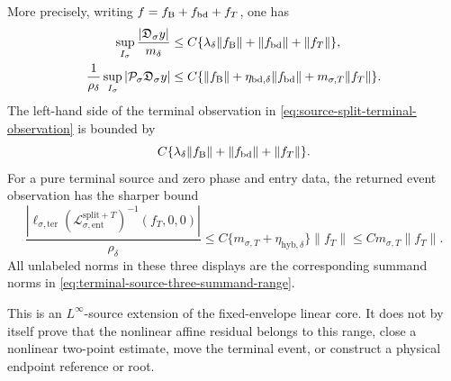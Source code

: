 \begin{corollary}
More precisely, writing
\(
f=f_{\rm B}+f_{\rm bd}+f_T
\), one has
\begin{align}
 \sup_{I_\sigma}\frac{|\mathfrak D_\sigma y|}{m_\delta}
 &\le C\{\lambda_\delta\|f_{\rm B}\|
       +\|f_{\rm bd}\|+\|f_T\|\},\notag\\
 \frac1{\rho_\delta}\sup_{I_\sigma}
       |\mathcal P_\sigma\mathfrak D_\sigma y|
 &\le C\{\|f_{\rm B}\|
       +\eta_{{\rm bd},\delta}\|f_{\rm bd}\|
       +m_{\sigma,T}\|f_T\|\}.                           \label{eq:terminal-source-returned-action-ledger}
\end{align}
The left-hand side of the terminal observation in
\cref{eq:source-split-terminal-observation} is bounded by
\begin{equation}
 C\{\lambda_\delta\|f_{\rm B}\|
       +\|f_{\rm bd}\|+\|f_T\|\}.                         \label{eq:terminal-source-extended-observation}
\end{equation}
For a pure terminal source and zero phase and entry data, the returned event
observation has the sharper bound
\begin{equation}
 \frac{|\ell_{\sigma,\mathrm{ter}}
   (\mathscr L_{\sigma,\mathrm{ent}}^{\mathrm{split}+T})^{-1}
       (f_T,0,0)|}{\rho_\delta}
 \le C\{m_{\sigma,T}+\eta_{\mathrm{hyb},\delta}\}
       \|f_T\|
 \le C m_{\sigma,T}\|f_T\|.                              \label{eq:terminal-source-event-smallness}
\end{equation}
All unlabeled norms in these three displays are the corresponding summand
norms in \cref{eq:terminal-source-three-summand-range}.

This is an \(L^\infty\)-source extension of the fixed-envelope linear core.
It does not by itself prove that the nonlinear affine residual belongs to
this range, close a nonlinear two-point estimate, move the terminal event,
or construct a physical endpoint reference or root.
\end{corollary}

